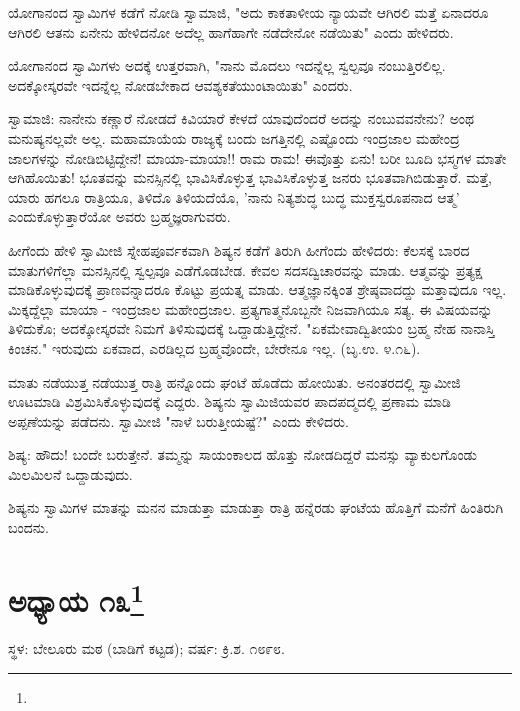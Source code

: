 ಯೋಗಾನಂದ ಸ್ವಾಮಿಗಳ ಕಡೆಗೆ ನೋಡಿ ಸ್ವಾಮಾಜಿ, "ಅದು ಕಾಕತಾಳೀಯ ನ್ಯಾಯವೇ ಆಗಿರಲಿ ಮತ್ತೆ ಏನಾದರೂ ಆಗಿರಲಿ ಆತನು ಏನೇನು ಹೇಳಿದನೋ ಅದೆಲ್ಲ ಹಾಗೆಹಾಗೇ ನಡೆದೇನೋ ನಡೆಯಿತು" ಎಂದು ಹೇಳಿದರು.

ಯೋಗಾನಂದ ಸ್ವಾಮಿಗಳು ಅದಕ್ಕೆ ಉತ್ತರವಾಗಿ, "ನಾನು ಮೊದಲು ಇದನ್ನೆಲ್ಲ ಸ್ವಲ್ಪವೂ ನಂಬುತ್ತಿರಲಿಲ್ಲ. ಅದಕ್ಕೋಸ್ಕರವೇ ಇದನ್ನೆಲ್ಲ ನೋಡಬೇಕಾದ ಆವಶ್ಯಕತೆಯುಂಟಾಯಿತು" ಎಂದರು.

ಸ್ವಾಮಾಜಿ: ನಾನೇನು ಕಣ್ಣಾರೆ ನೋಡದೆ ಕಿವಿಯಾರೆ ಕೇಳದೆ ಯಾವುದೆಂದರೆ ಅದನ್ನು ನಂಬುವವನೇನು? ಅಂಥ ಮನುಷ್ಯನಲ್ಲವೇ ಅಲ್ಲ. ಮಹಾಮಾಯೆಯ ರಾಜ್ಯಕ್ಕೆ ಬಂದು ಜಗತ್ತಿನಲ್ಲಿ ಎಷ್ಟೊಂದು ಇಂದ್ರಜಾಲ ಮಹೇಂದ್ರ ಜಾಲಗಳನ್ನು ನೋಡಿಬಿಟ್ಟಿದ್ದೇನೆ! ಮಾಯಾ-ಮಾಯಾ!! ರಾಮ ರಾಮ! ಈವೊತ್ತು ಏನು! ಬರೀ ಬೂದಿ ಭಸ್ಮಗಳ ಮಾತೇ ಆಗಿಹೊಯಿತು! ಭೂತವನ್ನು ಮನಸ್ಸಿನಲ್ಲಿ ಭಾವಿಸಿಕೊಳ್ಳುತ್ತ ಭಾವಿಸಿಕೊಳ್ಳುತ್ತ ಜನರು ಭೂತವಾಗಿಬಿಡುತ್ತಾರೆ. ಮತ್ತೆ, ಯಾರು ಹಗಲೂ ರಾತ್ರಿಯೂ, ತಿಳಿದೊ ತಿಳಿಯದೆಯೊ, 'ನಾನು ನಿತ್ಯಶುದ್ಧ ಬುದ್ಧ ಮುಕ್ತಸ್ವರೂಪನಾದ ಆತ್ಮ' ಎಂದುಕೊಳ್ಳುತ್ತಾರೆಯೋ ಅವರು ಬ್ರಹ್ಮಜ್ಞರಾಗುವರು.

ಹೀಗೆಂದು ಹೇಳಿ ಸ್ವಾಮೀಜಿ ಸ್ನೇಹಪೂರ್ವಕವಾಗಿ ಶಿಷ್ಯನ ಕಡೆಗೆ ತಿರುಗಿ ಹೀಗೆಂದು ಹೇಳಿದರು: ಕೆಲಸಕ್ಕೆ ಬಾರದ ಮಾತುಗಳಿಗೆಲ್ಲಾ ಮನಸ್ಸಿನಲ್ಲಿ ಸ್ವಲ್ಪವೂ ಎಡೆಗೊಡಬೇಡ. ಕೇವಲ ಸದಸದ್ವಿಚಾರವನ್ನು ಮಾಡು. ಆತ್ಮವನ್ನು ಪ್ರತ್ಯಕ್ಷ ಮಾಡಿಕೊಳ್ಳುವುದಕ್ಕೆ ಪ್ರಾಣವನ್ನಾದರೂ ಕೊಟ್ಟು ಪ್ರಯತ್ನ ಮಾಡು. ಆತ್ಮಜ್ಞಾನಕ್ಕಿಂತ ಶ್ರೇಷ್ಠವಾದದ್ದು ಮತ್ತಾವುದೂ ಇಲ್ಲ. ಮಿಕ್ಕದ್ದೆಲ್ಲಾ ಮಾಯಾ - ಇಂದ್ರಜಾಲ ಮಹೇಂದ್ರಜಾಲ. ಪ್ರತ್ಯಗಾತ್ಮನೊಬ್ಬನೇ ನಿಜವಾಗಿಯೂ ಸತ್ಯ. ಈ ವಿಷಯವನ್ನು ತಿಳಿದುಕೊ; ಅದಕ್ಕೋಸ್ಕರವೇ ನಿಮಗೆ ತಿಳಿಸುವುದಕ್ಕೆ ಒದ್ದಾಡುತ್ತಿದ್ದೇನೆ. "ಏಕಮೇವಾದ್ವಿತೀಯಂ ಬ್ರಹ್ಮ ನೇಹ ನಾನಾಸ್ತಿ ಕಿಂಚನ." ಇರುವುದು ಏಕವಾದ, ಎರಡಿಲ್ಲದ ಬ್ರಹ್ಮವೊಂದೇ, ಬೇರೇನೂ ಇಲ್ಲ. (ಬೃ.ಉ. ೪.೧೬).

ಮಾತು ನಡೆಯುತ್ತ ನಡೆಯುತ್ತ ರಾತ್ರಿ ಹನ್ನೊಂದು ಘಂಟೆ ಹೊಡೆದು ಹೋಯಿತು. ಅನಂತರದಲ್ಲಿ ಸ್ವಾಮೀಜಿ ಊಟಮಾಡಿ ವಿಶ್ರಮಿಸಿಕೊಳ್ಳುವುದಕ್ಕೆ ಎದ್ದರು. ಶಿಷ್ಯನು ಸ್ವಾಮಿಜಿಯವರ ಪಾದಪದ್ಮದಲ್ಲಿ ಪ್ರಣಾಮ ಮಾಡಿ ಅಪ್ಪಣೆಯನ್ನು ಪಡೆದನು. ಸ್ವಾಮೀಜಿ "ನಾಳೆ ಬರುತ್ತೀಯಷ್ಟೆ?" ಎಂದು ಕೇಳಿದರು.

ಶಿಷ್ಯ: ಹೌದು! ಬಂದೇ ಬರುತ್ತೇನೆ. ತಮ್ಮನ್ನು ಸಾಯಂಕಾಲದ ಹೊತ್ತು ನೋಡದಿದ್ದರೆ ಮನಸ್ಸು ವ್ಯಾಕುಲಗೊಂಡು ಮಿಲಮಿಲನೆ ಒದ್ದಾಡುವುದು.

ಶಿಷ್ಯನು ಸ್ವಾಮಿಗಳ ಮಾತನ್ನು ಮನನ ಮಾಡುತ್ತಾ ಮಾಡುತ್ತಾ ರಾತ್ರಿ ಹನ್ನೆರಡು ಘಂಟೆಯ ಹೊತ್ತಿಗೆ ಮನೆಗೆ ಹಿಂತಿರುಗಿ ಬಂದನು.

\newpage

\chapter[ಅಧ್ಯಾಯ ೧೩]{ಅಧ್ಯಾಯ ೧೩\protect\footnote{}}

\begin{center}
ಸ್ಥಳ: ಬೇಲೂರು ಮಠ (ಬಾಡಿಗೆ ಕಟ್ಟಡ); ವರ್ಷ: ಕ್ರಿ.ಶ. ೧೮೯೮.
\end{center}


